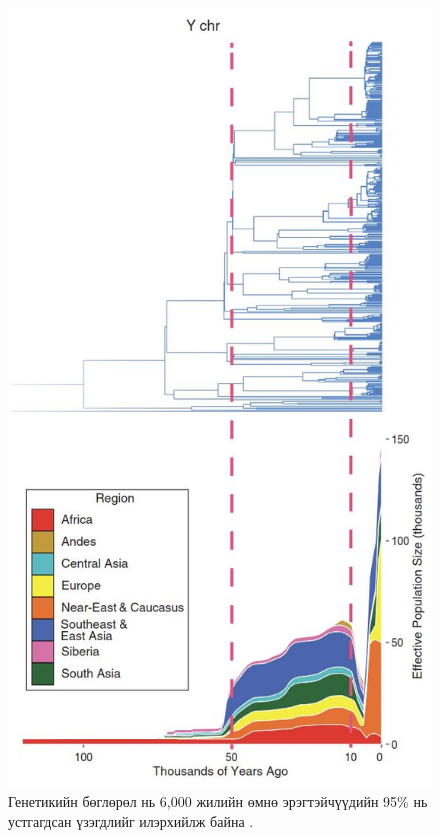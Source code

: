 \documentclass[10pt,twocolumn,letterpaper]{article}
\begin{document}
\begin{figure}[b]
\begin{center}
   \includegraphics[width=1\linewidth]{bottleneck.jpg}
\end{center}
   \caption{Генетикийн бөглөрөл нь 6,000 жилийн өмнө эрэгтэйчүүдийн 95\% нь устгагдсан үзэгдлийг илэрхийлж байна \cite{62}.}
\label{fig:10}
\label{fig:onecol}
\end{figure}
\end{document}
